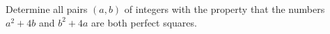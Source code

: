 Determine all pairs $(a,b)$ of integers with the property that the numbers $a^2+4b$ and $b^2+4a$ are both perfect squares.